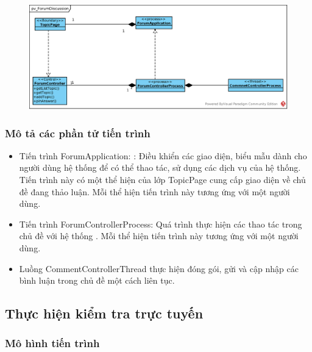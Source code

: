 \documentclass[./../main_file.tex]{subfiles}
\begin{document}
\begin{figure}[H]
	\centering
	\includegraphics[width=\linewidth]{./images/pv_ForumDiscussion.eps}
\end{figure}

\subsubsection{Mô tả các phần tử tiến trình}
\begin{itemize}
	\item Tiến trình ForumApplication: : Điều khiển các giao diện, biểu mẫu dành cho người dùng hệ thống để có thể thao tác, sử dụng các dịch vụ của hệ thống. Tiến trình này có một thể hiện của lớp TopicPage cung cấp giao diện về chủ đề đang thảo luận.
	Mỗi thể hiện tiến trình này tương ứng với một người dùng.
	\item Tiến trình ForumControllerProcess: Quá trình thực hiện các thao tác trong chủ đề với hệ thống .
	Mỗi thể hiện tiến trình này tương ứng với một người dùng.
	\item Luồng CommentControllerThread thực hiện đóng gói, gửi và cập nhập các bình luận trong chủ đề một cách liên tục.
	
\end{itemize}

\subsection{Thực hiện kiểm tra trực tuyến}

\subsubsection{Mô hình tiến trình}
\end{document}
